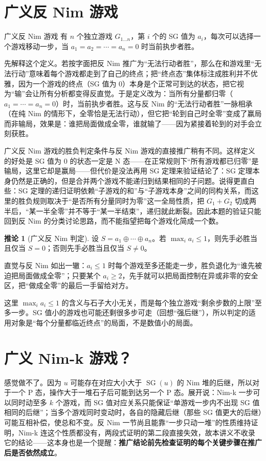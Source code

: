 \documentclass[UTF8,a4paper,11pt,oneside,openany,fontset=fandol]{ctexbook}
\theoremstyle{definition}
\newtheorem{corollary}[definition]{推论}
\newcommand{\SG}{\operatorname{SG}}
\begin{document}
\section{广义反 Nim 游戏}
\begin{problem}{广义反 Nim 游戏}
有 $n$ 个独立游戏 $G_{1\ldots n}$，第 $i$ 个的 SG 值为 $a_i$，每次可以选择一个游戏移动一步，当 $a_1=a_2=\cdots=a_n=0$ 时当前执步者胜。
\end{problem}

先解释这个定义。若按字面把反 Nim 推广为“无法行动者胜”，那么在和游戏里“无法行动”意味着每个游戏都走到了自己的终点；把“终点态”集体标注成胜利并不优雅，因为一个游戏的终点（SG 值为 $0$）本身是个正常可到达的状态，把它视为“输”会让所有分析都变得反直觉。于是定义改为：当所有分量都归零（$a_1=\cdots=a_n=0$）时，当前执步者胜。这与反 Nim 的“无法行动者胜”一脉相承（在纯 Nim 的情形下，全零恰是无法行动），但它把“轮到自己时全零”变成了赢局而非输局，效果是：谁把局面做成全零，谁就输了——因为紧接着轮到的对手会立刻获胜。

广义反 Nim 游戏的胜负判定条件与反 Nim 游戏的直接推广稍有不同。这样定义的好处是 SG 值为 $0$ 的状态一定是 N 态——在正常规则下“所有游戏都已归零”是输局，这里它却是赢局——但代价是没法再用 SG 定理来验证结论了：SG 定理本身仍然是正确的，但是合并两个游戏不能递归到结果相同的子问题。说得更直白些：SG 定理的递归证明依赖“子游戏的和”与“子游戏本身”之间的同构关系，而这里的胜负规则取决于“是否所有分量同时为零”这一全局性质，把 $G_1+G_2$ 切成两半后，“某一半全零”并不等于“某一半结束”，递归就此断裂。因此本题的验证只能回到反 Nim 的分类讨论思路，而不能指望把每个游戏化简成一个数。

\begin{corollary}[广义反 Nim 判定]
设 $S=a_1\oplus\cdots\oplus a_n$。若 $\max_i a_i\le1$，则先手必胜当且仅当 $S=0$；否则先手必胜当且仅当 $S\ne0$。
\end{corollary}

直觉与反 Nim 如出一辙：$a_i\le1$ 时每个游戏至多还能走一步，胜负退化为“谁先被迫把局面做成全零”；只要某个 $a_i\ge2$，先手就可以把局面控制在异或非零的安全区，把“做成全零”的最后一手留给对方。

\begin{pitfall}
这里 $\max_i a_i\le1$ 的含义与石子大小无关，而是每个独立游戏“剩余步数的上限”至多一步。SG 值小的游戏也可能还剩很多步可走（回想“强后继”），所以判定的适用对象是“每个分量都临近终点”的局面，不是数值小的局面。
\end{pitfall}

\section{广义 Nim-k 游戏？}
感觉做不了。因为 $u$ 可能存在对应大小大于 $\SG(u)$ 的 Nim 堆的后继，所以对于一个 P 态，操作大于一堆石子后可能到达另一个 P 态。展开说：Nim-k 一步可以同时动至多 $k$ 个游戏，而 SG 值对应关系只能保证“单游戏一步内不出现 SG 值相同的后继”；当多个游戏同时变动时，各自的隐藏后继（那些 SG 值更大的后继）可能互相补偿，使总和不变。反 Nim 一节尚且能靠“一步只动一堆”的性质维持证明，Nim-k 连这个性质都没有，两段式证明的第二段直接失效，故本讲义不收录它的结论——这本身也是一个提醒：\textbf{推广结论前先检查证明的每个关键步骤在推广后是否依然成立}。
\end{document}
